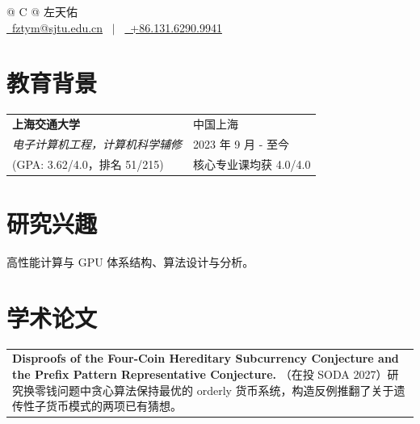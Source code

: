 \documentclass[a4paper,12pt]{article}
\begin{document}
\pagestyle{empty} 


\begin{tabularx}{\linewidth}{@{} C @{}}
\Huge{左天佑} \\[7.5pt]
\href{mailto:fztym@sjtu.edu.cn}{\raisebox{-0.05\height}\faEnvelope \ fztym@sjtu.edu.cn} \ $|$ \ 
\href{tel:+8613162909941}{\raisebox{-0.05\height}\faMobile \ +86.131.6290.9941} \\
\end{tabularx}


\section{教育背景}
\begin{tabularx}{\linewidth}{@{}l X@{}}	
\textbf{上海交通大学} & 中国上海 \\
\textit{电子计算机工程，计算机科学辅修} & 2023 年 9 月 - 至今 \\  
\normalsize (GPA: 3.62/4.0，排名 51/215) & 核心专业课均获 4.0/4.0\\
\end{tabularx}


\section{研究兴趣}
高性能计算与 GPU 体系结构、算法设计与分析。


\section{学术论文}
\begin{tabularx}{\linewidth}{@{}X@{}}
\textbf{Disproofs of the Four-Coin Hereditary Subcurrency Conjecture and the Prefix Pattern Representative Conjecture.} \normalsize（在投 SODA 2027）研究换零钱问题中贪心算法保持最优的 orderly 货币系统，构造反例推翻了关于遗传性子货币模式的两项已有猜想。 \\
\end{tabularx}
\end{document}
